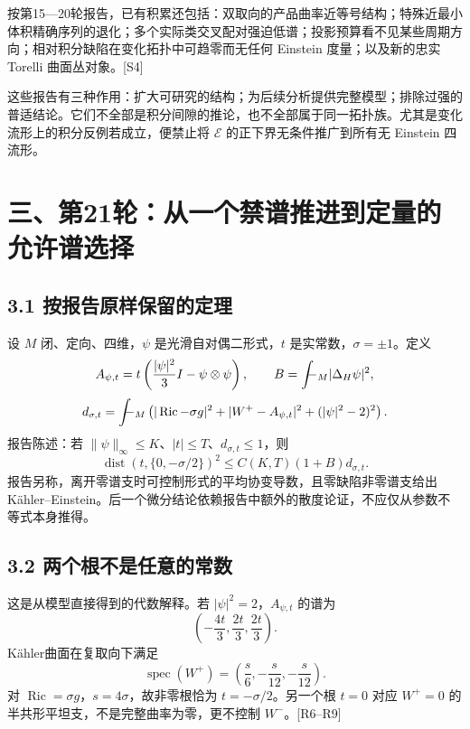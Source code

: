 \documentclass[
  11pt,
  a4paper,
  fontset=none]{ctexart}
\newcommand{\avgint}{\mathchoice{\displaystyle\int\!\!\!\!-}{\textstyle\int\!\!\!-}{\scriptstyle\int\!\!\!-}{\scriptscriptstyle\int\!\!\!-}}
\begin{document}
按第15---20轮报告，已有积累还包括：双取向的产品曲率近等号结构；特殊近最小体积精确序列的退化；多个实际类交叉配对强迫低谱；投影预算看不见某些周期方向；相对积分缺陷在变化拓扑中可趋零而无任何
Einstein 度量；以及新的忠实 Torelli 曲面丛对象。{[}S4{]}

这些报告有三种作用：扩大可研究的结构；为后续分析提供完整模型；排除过强的普适结论。它们不全部是积分间隙的推论，也不全部属于同一拓扑族。尤其是变化流形上的积分反例若成立，便禁止将
\(\mathcal E\) 的正下界无条件推广到所有无 Einstein 四流形。

\section{三、第21轮：从一个禁谱推进到定量的允许谱选择}\label{ux4e09ux7b2c21ux8f6eux4eceux4e00ux4e2aux7981ux8c31ux63a8ux8fdbux5230ux5b9aux91cfux7684ux5141ux8bb8ux8c31ux9009ux62e9}

\subsection{3.1
按报告原样保留的定理}\label{ux6309ux62a5ux544aux539fux6837ux4fddux7559ux7684ux5b9aux7406}

设 \(M\) 闭、定向、四维，\(\psi\) 是光滑自对偶二形式，\(t\)
是实常数，\(\sigma=\pm1\)。定义 \[
A_{\psi,t}=t\left(\frac{|\psi|^2}{3}I-\psi\otimes\psi\right),
\qquad B=\avgint_M|\Delta_H\psi|^2,
\] \[
d_{\sigma,t}=\avgint_M\left(
|\operatorname{Ric}-\sigma g|^2+
|W^+-A_{\psi,t}|^2+(|\psi|^2-2)^2\right).
\] 报告陈述：若
\(\|\psi\|_\infty\le K\)、\(|t|\le T\)、\(d_{\sigma,t}\le1\)，则 \[
\boxed{
\operatorname{dist}\!\left(t,\{0,-\sigma/2\}\right)^2
\le C(K,T)(1+B)d_{\sigma,t}.
}
\tag{R21}
\] 报告另称，离开零谱支时可控制形式的平均协变导数，且零缺陷非零谱支给出
Kähler--Einstein。后一个微分结论依赖报告中额外的散度论证，不应仅从参数不等式本身推得。

\subsection{3.2
两个根不是任意的常数}\label{ux4e24ux4e2aux6839ux4e0dux662fux4efbux610fux7684ux5e38ux6570}

这是从模型直接得到的代数解释。若 \(|\psi|^2=2\)，\(A_{\psi,t}\) 的谱为
\[
\left(-\frac{4t}{3},\frac{2t}{3},\frac{2t}{3}\right).
\] Kähler曲面在复取向下满足 \[
\operatorname{spec}(W^+)=\left(\frac{s}{6},-\frac{s}{12},-\frac{s}{12}\right).
\] 对 \(\operatorname{Ric}=\sigma g\)，\(s=4\sigma\)，故非零根恰为
\(t=-\sigma/2\)。另一个根 \(t=0\) 对应 \(W^+=0\)
的半共形平坦支，不是完整曲率为零，更不控制 \(W^-\)。{[}R6--R9{]}
\end{document}

